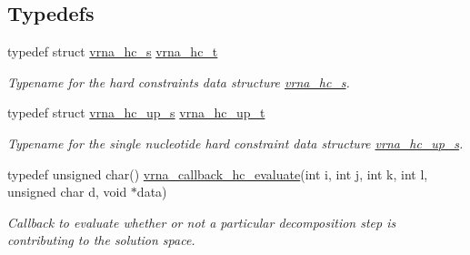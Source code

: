 \subsection*{Typedefs}
\begin{DoxyCompactItemize}
\item 
\mbox{\label{group__hard__constraints_gac7e4c4f8abe3163a68110c5bff24e01d}} 
typedef struct \mbox{\hyperlink{group__hard__constraints_structvrna__hc__s}{vrna\+\_\+hc\+\_\+s}} \mbox{\hyperlink{group__hard__constraints_gac7e4c4f8abe3163a68110c5bff24e01d}{vrna\+\_\+hc\+\_\+t}}
\begin{DoxyCompactList}\small\item\em Typename for the hard constraints data structure \mbox{\hyperlink{group__hard__constraints_structvrna__hc__s}{vrna\+\_\+hc\+\_\+s}}. \end{DoxyCompactList}\item 
\mbox{\label{group__hard__constraints_ga8cd53427a942a81c87ec526bbff32ef9}} 
typedef struct \mbox{\hyperlink{group__hard__constraints_structvrna__hc__up__s}{vrna\+\_\+hc\+\_\+up\+\_\+s}} \mbox{\hyperlink{group__hard__constraints_ga8cd53427a942a81c87ec526bbff32ef9}{vrna\+\_\+hc\+\_\+up\+\_\+t}}
\begin{DoxyCompactList}\small\item\em Typename for the single nucleotide hard constraint data structure \mbox{\hyperlink{group__hard__constraints_structvrna__hc__up__s}{vrna\+\_\+hc\+\_\+up\+\_\+s}}. \end{DoxyCompactList}\item 
typedef unsigned char() \mbox{\hyperlink{group__hard__constraints_gae465f1d4a3d8b6592b38ecbb0d9f613d}{vrna\+\_\+callback\+\_\+hc\+\_\+evaluate}}(int i, int j, int k, int l, unsigned char d, void $\ast$data)
\begin{DoxyCompactList}\small\item\em Callback to evaluate whether or not a particular decomposition step is contributing to the solution space. \end{DoxyCompactList}\end{DoxyCompactItemize}
